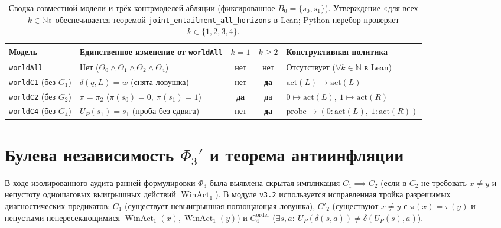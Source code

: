 \documentclass[10pt,a4paper]{article}
\theoremstyle{cleanthm}
\theoremstyle{cleandef}
\DeclareMathOperator{\WinAct}{WinAct}
\begin{document}
\begin{table}[!htbp]
\centering
\caption{Сводка совместной модели и трёх контрмоделей абляции (фиксированное $B_0=\{s_0,s_1\}$). Утверждение «для всех $k\in\mathbb{N}$» обеспечивается теоремой \texttt{joint\_\allowbreak entailment\_\allowbreak all\_\allowbreak horizons} в Lean; Python-перебор проверяет $k\in\{1,2,3,4\}$.}
\label{tab:countermodels}
\small
\begin{tabularx}{\linewidth}{@{}l >{\raggedright\arraybackslash}X c c >{\raggedright\arraybackslash}X@{}}
\toprule
\textbf{Модель} & \textbf{Единственное изменение от \texttt{worldAll}} & \textbf{$k=1$} & \textbf{$k\ge 2$} & \textbf{Конструктивная политика} \\
\midrule
\texttt{worldAll} & Нет ($\Theta_0\land\Theta_1\land\Theta_2\land\Theta_4$) & нет & нет & Отсутствует ($\forall k\in\mathbb{N}$ в Lean) \\
\texttt{worldC1} (без $G_1$) & $\delta(q,L)=w$ (снята ловушка) & нет & \textbf{да} & $\mathrm{act}(L)\to\mathrm{act}(L)$ \\
\texttt{worldC2} (без $G_2$) & $\pi=\pi_2$ ($\pi(s_0)=0,\ \pi(s_1)=1$) & \textbf{да} & да & $0\mapsto\mathrm{act}(L),\ 1\mapsto\mathrm{act}(R)$ \\
\texttt{worldC4} (без $G_4$) & $U_P(s_1)=s_1$ (проба без сдвига) & нет & \textbf{да} & $\mathrm{probe}\to(0:\mathrm{act}(L),\ 1:\mathrm{act}(R))$ \\
\bottomrule
\end{tabularx}
\end{table}

\section{Булева независимость \texorpdfstring{$\Phi_3'$}{Phi3'} и теорема антиинфляции}

В ходе изолированного аудита ранней формулировки $\Phi_3$ была выявлена скрытая импликация $C_1\implies C_2$ (если в $C_2$ не требовать $x\ne y$ и непустоту одношаговых выигрышных действий $\WinAct_1$). В модуле \texttt{v3.2} используется исправленная тройка разрешимых диагностических предикатов: $C_1$ (существует невыигрышная поглощающая ловушка), $C'_2$ (существуют $x\ne y$ с $\pi(x)=\pi(y)$ и непустыми непересекающимися $\WinAct_1(x),\WinAct_1(y)$) и $C_4^{\mathrm{order}}$ ($\exists s,a:\ U_P(\delta(s,a))\ne\delta(U_P(s),a)$).
\end{document}
